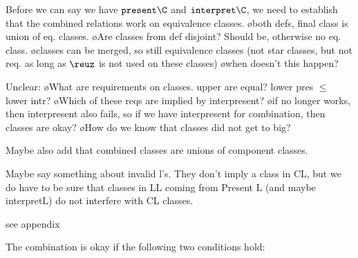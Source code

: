 



\bc



Before we can say we have $\present\C$ and $\interpret\C$, we need to establish that the combined relations work on equivalence classes.
\bl
\o both defs, final class is union of eq. classes. 
\o Are classes from def disjoint? Should be, otherwise no eq. class. 
\o classes can be merged, so still equivalence classes (not star classes, but not req. as long as $\reuz$ is not used on these classes)
\o when doesn't this happen?
\el

Unclear:
\bl
\o What are requirements on classes. upper are equal? lower pres $\leq$ lower intr?
\o Which of these reqs are implied by interpresent?
\o if no longer works, then interpresent also fails, so if we have interpresent for combination, then classes are okay? 
\o How do we know that classes did not get to big?
\el

Maybe also add that combined classes are unions of component classes.

Maybe say something about invalid l's. They don't imply a class in CL, but we do have to be sure that classes in LL coming from Present L (and maybe interpretL) do not interfere with CL classes.

see appendix
\ec

The combination is okay if the following two conditions hold:


